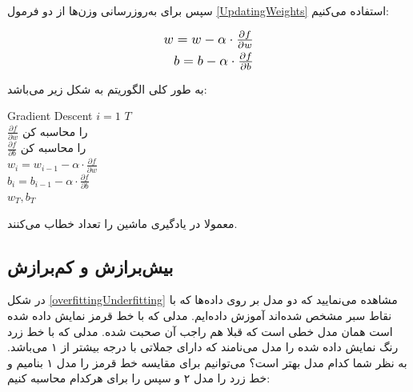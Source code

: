 \documentclass[a4paper, titlepage]{article}
\begin{document}
سپس برای به‌روز‌رسانی وزن‌ها از دو فرمول \ref{UpdatingWeights} استفاده می‌کنیم:

\begin{equation}
    \begin{split}
        \scalebox{1.2}{$w = w - \alpha \cdot \frac{\partial f}{\partial w}$} \\
        \scalebox{1.2}{$b = b - \alpha \cdot \frac{\partial f}{\partial b}$}
    \end{split}
    \label{UpdatingWeights}       
\end{equation}

به طور کلی الگوریتم  به شکل زیر می‌باشد:

\begin{algorithm}[!htp]
	\begin{algo}{Gradient Descent}{
	\small 
	\label{alg:deep-learning-gradient-descent}
	}
		\qfor $i = 1$ \qto $T$\\
			$\frac{\partial f}{\partial w}$ را محاسبه کن\\
			$\frac{\partial f}{\partial b}$ را محاسبه کن\\

			$w_i = w_{i-1} - \alpha \cdot \frac{\partial f}{\partial w}$\\
			$b_i = b_{i-1} - \alpha \cdot \frac{\partial f}{\partial b}$\qrof\\
		\qreturn $w_{T}, b_{T}$
	\end{algo}
	\caption{}
\end{algorithm}

معمولا در یادگیری ماشین  را تعداد  خطاب می‌کنند.

\subsection{بیش‌برازش و کم‌برازش }


در شکل \ref{overfittingUnderfitting} مشاهده می‌نمایید که دو مدل بر روی داده‌ها که با نقاط سبر مشخص شده‌اند آموزش داده‌ایم.
مدلی که با خط قرمز نمایش داده شده است همان مدل خطی است که قبلا هم راجب آن صحبت شده. مدلی که با خط زرد رنگ نمایش داده شده را مدل  می‌نامند که دارای جملاتی با درجه بیشتر از ۱ می‌باشد. به نظر شما کدام مدل بهتر است؟ می‌توانیم برای مقایسه خط قرمز را مدل ۱ بنامیم و خط زرد را مدل ۲ و سپس  را برای هرکدام محاسبه کنیم:
\end{document}
